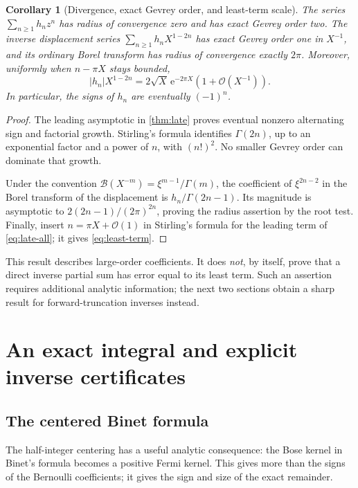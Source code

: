 \documentclass[11pt,a4paper]{article}
\newtheorem{corollary}[theorem]{Corollary}
\theoremstyle{definition}
\numberwithin{equation}{section}
\newcommand{\ee}{\mathrm{e}}
\newcommand{\Oh}{\mathcal O}
\newcommand{\Borel}{\mathcal B}
\begin{document}
\begin{corollary}[Divergence, exact Gevrey order, and least-term scale]
\label{cor:gevrey}
The series $\sum_{n\ge1}h_nz^n$ has radius of convergence zero and has exact Gevrey order two. The inverse displacement series
$\sum_{n\ge1}h_nX^{1-2n}$ has exact Gevrey order one in $X^{-1}$, and its ordinary Borel transform has radius of convergence exactly $2\pi$. Moreover, uniformly when $n-\pi X$ stays bounded,
\begin{equation}
 |h_n|X^{1-2n}=2\sqrt X\,\ee^{-2\pi X}
                  \left(1+\Oh(X^{-1})\right).
 \label{eq:least-term}
\end{equation}
In particular, the signs of $h_n$ are eventually $(-1)^n$.
\end{corollary}
\begin{proof}
The leading asymptotic in \cref{thm:late} proves eventual nonzero alternating sign and factorial growth. Stirling's formula identifies $\Gamma(2n)$, up to an exponential factor and a power of $n$, with $(n!)^2$. No smaller Gevrey order can dominate that growth.

Under the convention
$\Borel(X^{-m})=\xi^{m-1}/\Gamma(m)$, the coefficient of $\xi^{2n-2}$ in the Borel transform of the displacement is $h_n/\Gamma(2n-1)$. Its magnitude is asymptotic to $2(2n-1)/(2\pi)^{2n}$, proving the radius assertion by the root test. Finally, insert $n=\pi X+\Oh(1)$ in Stirling's formula for the leading term of \eqref{eq:late-all}; it gives \eqref{eq:least-term}.
\end{proof}

This result describes large-order coefficients. It does \emph{not}, by itself, prove that a direct inverse partial sum has error equal to its least term. Such an assertion requires additional analytic information; the next two sections obtain a sharp result for forward-truncation inverses instead.

\section{An exact integral and explicit inverse certificates}
\label{sec:integral}

\subsection{The centered Binet formula}
The half-integer centering has a useful analytic consequence: the Bose kernel in Binet's formula becomes a positive Fermi kernel. This gives more than the signs of the Bernoulli coefficients; it gives the sign and size of the exact remainder.
\end{document}
